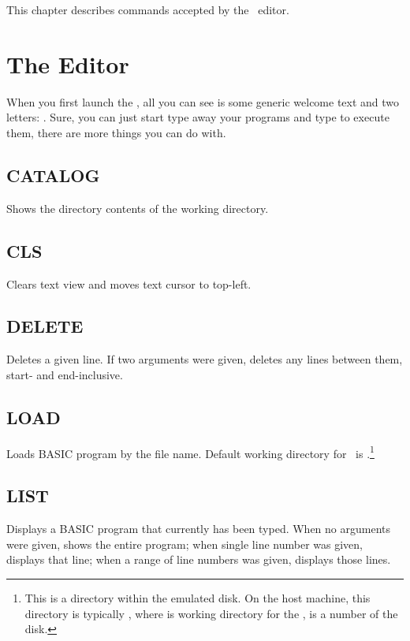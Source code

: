 This chapter describes commands accepted by the \tbas\ editor.

\section{The Editor}

When you first launch the \tbas, all you can see is some generic welcome text and two letters: . Sure, you can just start type away your programs and type  to execute them, there are more things you can do with.

\subsection{CATALOG}
    \par
    Shows the directory contents of the working directory.

\subsection{CLS}
    \par
    Clears text view and moves text cursor to top-left.

\subsection{DELETE}
    \par
    Deletes a given line. If two arguments were given, deletes any lines between them, start- and end-inclusive.

\subsection{LOAD}
    \par
    Loads BASIC program by the file name. Default working directory for \tbas\ is .\footnote{This is a directory within the emulated disk. On the host machine, this directory is typically , where  is working directory for the \thismachine,  is a number of the disk.}
    
\subsection{LIST}
    \par
    Displays a BASIC program that currently has been typed. When no arguments were given, shows the entire program; when single line number was given, displays that line; when a range of line numbers was given, displays those lines.
    

